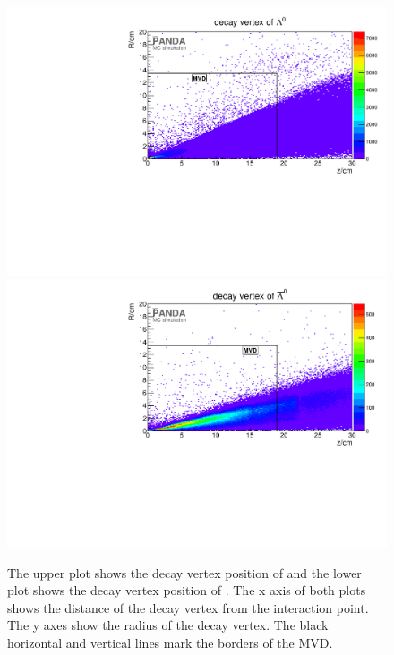 		\begin{figure}
		
			\centering
			\includegraphics[width=1.\textwidth]{./plots/lambda0/lambda0_decay_vtx.pdf}
			\includegraphics[width=1.\textwidth]{./plots/antilambda0/antiLambda0_decay_vtx.pdf}
			\caption{\propose The upper plot shows the decay vertex position of \lam and the lower plot shows the decay vertex position of \alam. 
					The x axis of both plots shows the distance of the decay vertex from the interaction point. The y axes show the radius of the decay vertex.
					The black horizontal and vertical lines mark the borders of the MVD.}
			\label{fig:lambda0_antilambda0_decay_vtx}
		
		\end{figure}
		
		
		
